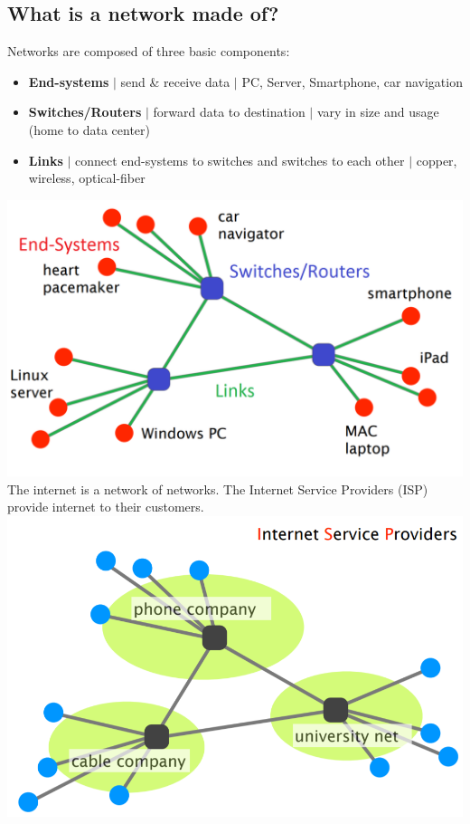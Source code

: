 \documentclass[a4paper, fontsize=8pt, landscape, DIV=1]{scrartcl}
\begin{document}
\begin{multicols*}{4}
			\subsection{What is a network made of?}
				\vspace{0.1cm}
				Networks are composed of three basic components:
				\begin{itemize}
					\item \textbf{End-systems} $\vert$ send \& receive data $\vert$  PC, Server, Smartphone, car navigation
					\item \textbf{Switches/Routers} $\vert$ forward data to destination $\vert$ vary in size and usage (home to data center)
					\item \textbf{Links} $\vert$ connect end-systems to switches and switches to each other $\vert$ copper, wireless, optical-fiber
				\end{itemize}
				\includegraphics[width= \columnwidth]{images/Overview/network_components.png}
				The internet is a network of networks. The Internet Service Providers (ISP) provide internet to their customers.\\
				\includegraphics[width= \columnwidth]{images/Overview/ISP.png}
				\columnbreak
			

\end{multicols*}
\end{document}
